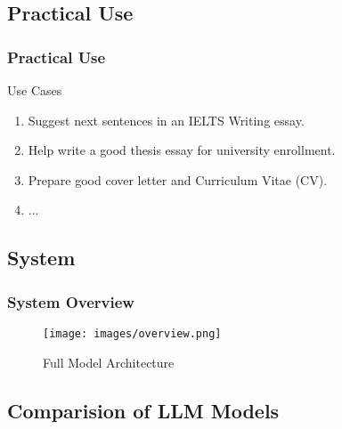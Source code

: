 \documentclass[10pt]{beamer}
\begin{document}

\subsection{Practical Use} %

\begin{frame}
\frametitle{Practical Use}

\begin{exampleblock}{Use Cases}
    \begin{enumerate}
        \item \alert{Suggest next sentences in an IELTS Writing essay.}
        \item Help write a good thesis essay for university enrollment.
        \item Prepare good cover letter and Curriculum Vitae (CV).
        \item ...
    \end{enumerate}
\end{exampleblock}
\end{frame}


\subsection{System}

\begin{frame}
\frametitle{System Overview}

\begin{figure}
    \centering    \texttt{[image: images/overview.png]}
    \caption{Full Model Architecture}
    \label{fig:system_overview}
\end{figure}

\end{frame}





\subsection{Comparision of LLM Models}
\end{document}

